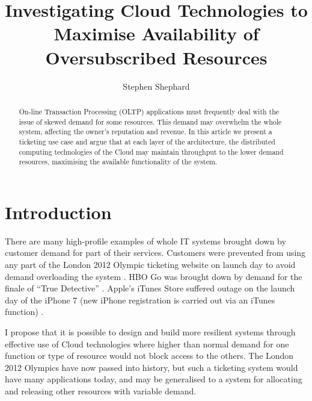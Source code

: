 \documentclass{llncs}
\begin{document}
\title{Investigating Cloud Technologies to Maximise Availability of Oversubscribed Resources}

\author{Stephen Shephard}


\maketitle

\begin{abstract}
On-line Transaction Processing (OLTP) applications must frequently deal with the issue of skewed demand for some resources.  This demand may overwhelm the whole system, affecting the owner's reputation and revenue.  In this article we present a ticketing use case and argue that at each layer of the architecture, the distributed computing technologies of the Cloud may maintain throughput to the lower demand resources, maximising the available functionality of the system.  
\end{abstract}

\section{Introduction}

There are many high-profile examples of whole IT systems brought down by customer demand for part of their services.  Customers were prevented from using any part of the London 2012 Olympic ticketing website on launch day to avoid demand overloading the system \cite{telegraph2011olympics}.  HBO Go was brought down by demand for the finale of ``True Detective'' \cite{hbo2014}.  Apple's iTunes Store suffered outage on the launch day of the iPhone 7 (new iPhone registration is carried out via an iTunes function) \cite{itunes2016}.

I propose that it is possible to design and build more resilient systems through effective use of Cloud technologies where higher than normal demand for one function or type of resource would not block access to the others. The London 2012 Olympics have now passed into history, but such a ticketing system would have many applications today, and may be generalised to a system for allocating and releasing other resources with variable demand.
\end{document}
